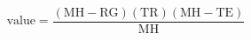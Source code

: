 \documentclass{article}
\begin{document}
{\Huge\[
\text{value} = \frac{(\text{MH} - \text{RG})(\text{TR})(\text{MH} - \text{TE})}{\text{MH}}
\]}%
\end{document}
